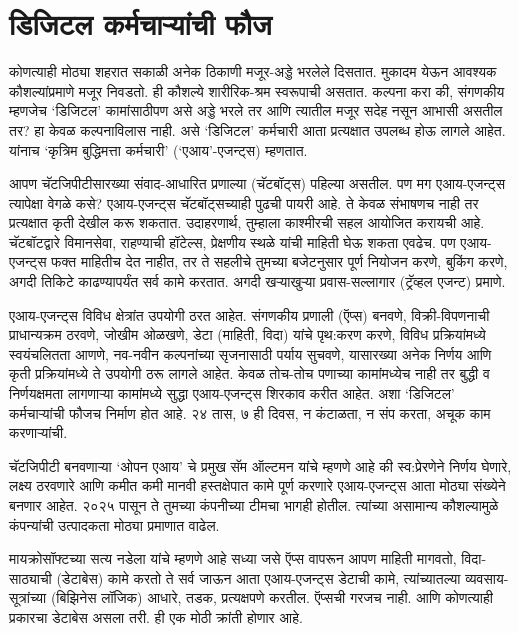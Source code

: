 \chapter{डिजिटल कर्मचाऱ्यांची फौज}

कोणत्याही मोठ्या शहरात सकाळी अनेक ठिकाणी मजूर-अड्डे भरलेले दिसतात. मुकादम येऊन आवश्यक कौशल्यांप्रमाणे मजूर निवडतो. ही कौशल्ये शारीरिक-श्रम स्वरूपाची असतात. कल्पना करा की, संगणकीय म्हणजेच `डिजिटल' कामांसाठीपण असे अड्डे भरले तर आणि त्यातील मजूर सदेह  नसून आभासी असतील तर? हा केवळ कल्पनाविलास  नाही. असे `डिजिटल' कर्मचारी आता प्रत्यक्षात उपलब्ध होऊ लागले आहेत. यांनाच `कृत्रिम बुद्धिमत्ता कर्मचारी' (`एआय'-एजन्ट्स) म्हणतात. 

आपण चॅटजिपीटीसारख्या संवाद-आधारित प्रणाल्या (चॅटबॉट्स) पहिल्या असतील. पण मग एआय-एजन्ट्स त्यापेक्षा वेगळे कसे? एआय-एजन्ट्स चॅटबॉट्सच्याही पुढची पायरी आहे. ते केवळ संभाषणच नाही तर प्रत्यक्षात कृती देखील करू शकतात. उदाहरणार्थ, तुम्हाला काश्मीरची सहल आयोजित करायची आहे. चॅटबॉटद्वारे विमानसेवा, राहण्याची हॉटेल्स, प्रेक्षणीय स्थळे यांची माहिती घेऊ शकता एवढेच. पण एआय-एजन्ट्स फक्त माहितीच देत नाहीत, तर ते सहलीचे तुमच्या बजेटनुसार पूर्ण नियोजन करणे, बुकिंग करणे, अगदी तिकिटे काढण्यापर्यंत सर्व कामे करतात. अगदी खऱ्याखुऱ्या प्रवास-सल्लागार (ट्रॅव्हल एजन्ट) प्रमाणे. 

एआय-एजन्ट्स  विविध क्षेत्रांत उपयोगी ठरत आहेत. संगणकीय प्रणाली (ऍप्स) बनवणे, विक्री-विपणनाची प्राधान्यक्रम ठरवणे, जोखीम ओळखणे, डेटा (माहिती, विदा) यांचे पृथ:करण करणे, विविध प्रक्रियांमध्ये स्वयंचलितता आणणे, नव-नवीन कल्पनांच्या सृजनासाठी पर्याय सुचवणे, यासारख्या अनेक निर्णय आणि कृती प्रक्रियांमध्ये ते उपयोगी ठरू लागले आहेत. केवळ तोच-तोच पणाच्या कामांमध्येच नाही तर बुद्धी व निर्णयक्षमता लागणाऱ्या कामांमध्ये सुद्धा एआय-एजन्ट्स शिरकाव करीत आहेत. अशा `डिजिटल' कर्मचाऱ्यांची फौजच निर्माण होत आहे. २४ तास, ७ ही दिवस, न कंटाळता, न संप करता, अचूक काम करणाऱ्यांची. 

चॅटजिपीटी बनवणाऱ्या `ओपन एआय' चे प्रमुख सॅम ऑल्टमन यांचे म्हणणे आहे की स्व:प्रेरणेने निर्णय घेणारे, लक्ष्य ठरवणारे आणि कमीत कमी मानवी हस्तक्षेपात कामे पूर्ण करणारे एआय-एजन्ट्स आता मोठ्या संख्येने बनणार आहेत. २०२५ पासून ते तुमच्या कंपनीच्या टीमचा भागही होतील. त्यांच्या असामान्य कौशल्यामुळे कंपन्यांची उत्पादकता मोठ्या प्रमाणात वाढेल. 

मायक्रोसॉफ्टच्या सत्य नडेला यांचे म्हणणे आहे सध्या जसे ऍप्स वापरून आपण माहिती मागवतो, विदा-साठ्याची (डेटाबेस) कामे करतो ते सर्व जाऊन आता एआय-एजन्ट्स डेटाची कामे, त्यांच्यातल्या व्यवसाय-सूत्रांच्या (बिझिनेस लॉजिक) आधारे, तडक, प्रत्यक्षपणे करतील. ऍप्सची गरजच नाही. आणि कोणत्याही प्रकारचा डेटाबेस असला तरी. ही एक मोठी क्रांती होणार आहे.

